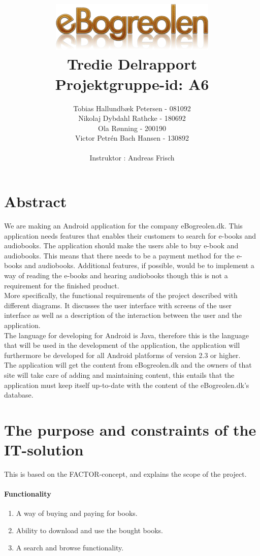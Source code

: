 \message{ !name(Rapport.tex)}\documentclass[12pt]{article}
\title{\includegraphics[scale=1]{store_logo}\\Tredie Delrapport \\ Projektgruppe-id: A6}
\author{Tobias Hallundbæk Petersen - 081092\\Nikolaj Dybdahl Rathcke - 180692\\ Ola Rønning - 200190\\ Victor Petrén Bach Hansen - 130892 \\\\ Instruktor : Andreas Frisch}
\begin{document}

\maketitle
\newpage
\tableofcontents
\newpage
\section{Abstract}
We are making an Android application for the company eBogreolen.dk. This application needs features that enables their customers to search for e-books and audiobooks. The application should make the users able to buy e-book and audiobooks. This means that there needs to be a payment method for the e-books and audiobooks. Additional features, if possible, would be to implement a way of reading the e-books and hearing audiobooks though this is not a requirement for the finished product.\\
More specifically, the functional requirements of the project described with different diagrams. It discusses the user interface with screens of the user interface as well as a description of the interaction between the user and the application.\\
The language for developing for Android is Java, therefore this is the language that will be used in the development of the application, the application will furthermore be developed for all Android platforms of version 2.3 or higher.\\
The application will get the content from eBogreolen.dk and the owners of that site will take care of adding and maintaining content, this entails that the application must keep itself up-to-date with the content of the eBogreolen.dk's database.

\section{The purpose and constraints of the IT-solution}
This is based on the FACTOR-concept, and explains the scope of the project.
\paragraph{Functionality}
\begin{enumerate}
\item A way of buying and paying for books.
\item Ability to download and use the bought books.
\item A search and browse functionality.
\end{enumerate}
\end{document}
